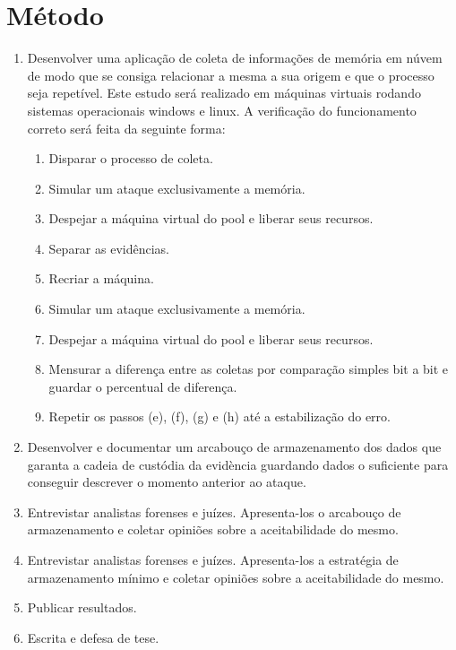 \documentclass[12pt,				%
	openright,			%
	oneside,			%
	a4paper,			%
	english,			%
	brazil				%
	]{abntex2}
\begin{document}
\chapter{Método} \label{chap:metodo}
\begin{enumerate}
 \item Desenvolver uma aplicação de coleta de informações de memória em núvem de modo que se consiga relacionar a mesma a sua origem e que
o processo seja repetível. Este estudo será realizado em máquinas virtuais rodando sistemas operacionais windows e linux. A verificação do funcionamento correto será feita 
da seguinte forma:

\begin{enumerate}
 \item Disparar o processo de coleta.
 \item Simular um ataque exclusivamente a memória.
 \item Despejar a máquina virtual do pool e liberar seus recursos.
 \item Separar as evidências.
 \item Recriar a máquina.
 \item Simular um ataque exclusivamente a memória.
 \item Despejar a máquina virtual do pool e liberar seus recursos.
 \item Mensurar a diferença entre as coletas por comparação simples bit a bit e guardar o percentual de diferença.
 \item Repetir os passos (e), (f), (g) e (h) até a estabilização do erro.
\end{enumerate}

\item Desenvolver e documentar um arcabouço de armazenamento dos dados que garanta a cadeia de custódia da evidència guardando dados o suficiente para 
conseguir descrever o momento anterior ao ataque.

\item Entrevistar analistas forenses e juízes. Apresenta-los o arcabouço de armazenamento e coletar opiniões sobre a aceitabilidade do mesmo.

\item Entrevistar analistas forenses e juízes. Apresenta-los a estratégia de armazenamento mínimo e coletar opiniões sobre a aceitabilidade do mesmo. 

\item Publicar resultados.

\item Escrita e defesa de tese.

\end{enumerate}
\end{document}
